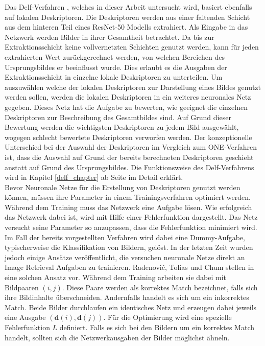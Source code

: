 Das Delf-Verfahren \cite{delf}, welches in dieser Arbeit untersucht wird, basiert ebenfalls auf lokalen Deskriptoren. Die Deskriptoren werden aus einer faltenden Schicht aus dem hinteren Teil eines ResNet-50 \cite{resnet} Modells extrahiert. Als Eingabe in das Netzwerk werden Bilder in ihrer Gesamtheit betrachtet. Da bis zur Extraktionsschicht keine vollvernetzten Schichten genutzt werden, kann für jeden extrahierten Wert zurückgerechnet werden, von welchen Bereichen des Ursprungsbildes er beeinflusst wurde. Dies erlaubt es die Ausgaben der Extraktionsschicht in einzelne lokale Deskriptoren zu unterteilen. Um auszuwählen welche der lokalen Deskriptoren zur Darstellung eines Bildes genutzt werden sollen, werden die lokalen Deskriptoren in ein weiteres neuronales Netz gegeben. Dieses Netz hat die Aufgabe zu bewerten, wie geeignet die einzelnen Deskriptoren zur Beschreibung des Gesamtbildes sind. Auf Grund dieser Bewertung werden die wichtigsten Deskriptoren zu jedem Bild ausgewählt, wogegen schlecht bewertete Deskriptoren verworfen werden. Der konzeptionelle Unterschied bei der Auswahl der Deskriptoren im Vergleich zum ONE-Verfahren ist, dass die Auswahl auf Grund der bereits berechneten Deskriptoren geschieht anstatt auf Grund des Ursprungsbildes. Die Funktionsweise des Delf-Verfahrens wird in Kapitel \ref{delf_chapter} ab Seite \pageref{delf_chapter} im Detail erklärt.
\\  
Bevor Neuronale Netze für die Erstellung von Deskriptoren genutzt werden können, müssen ihre Parameter in einem Trainingsverfahren optimiert werden. Während dem Training muss das Netzwerk eine Aufgabe lösen. Wie erfolgreich das Netzwerk dabei ist, wird mit Hilfe einer Fehlerfunktion dargestellt. Das Netz versucht seine Parameter so anzupassen, dass die Fehlerfunktion minimiert wird. Im Fall der bereits vorgestellten Verfahren wird dabei eine Dummy-Aufgabe, typischerweise die Klassifikation von Bildern, gelöst. In der letzten Zeit wurden jedoch einige Ansätze veröffentlicht, die versuchen neuronale Netze direkt an Image Retrieval Aufgaben zu trainieren. Radenović, Tolias und Chum stellen in \cite{siamac_contrastive_loss} eine solchen Ansatz vor. Während dem Training arbeiten sie dabei mit Bildpaaren $(i,j)$. Diese Paare werden als korrektes Match bezeichnet, falls sich ihre Bildinhalte überschneiden. Andernfalls handelt es sich um ein inkorrektes Match. Beide Bilder durchlaufen ein identisches Netz und erzeugen dabei jeweils eine Ausgabe $(\mathbf{d}(i),\mathbf{d}(j))$. Für die Optimierung wird eine spezielle Fehlerfunktion $L$ definiert. Falls es sich bei den Bildern um ein korrektes Match handelt, sollten sich die Netzwerkausgaben der Bilder möglichst ähneln.
